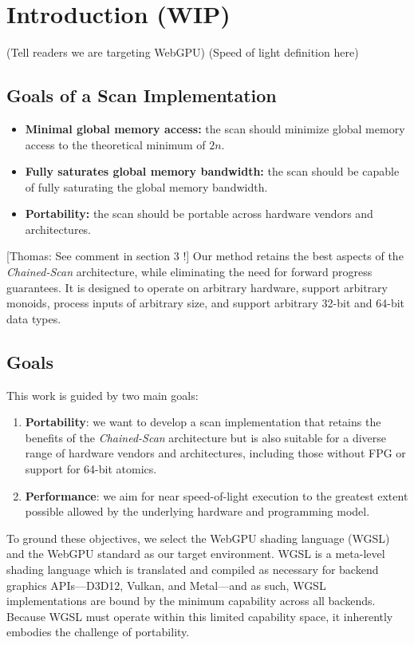 \documentclass[sigconf]{acmart}
\newcommand{\thomas}[1]{{\footnotesize\color{orange}[Thomas: #1]}}
\begin{document}
\section{Introduction (WIP)}
(Tell readers we are targeting WebGPU)
(Speed of light definition here)
\subsection{Goals of a Scan Implementation}
\begin{itemize}
  \item \textbf{Minimal global memory access:} the scan should minimize global memory access to the theoretical minimum of $2n$.
  \item \textbf{Fully saturates global memory bandwidth:} the scan should be capable of fully saturating the global memory bandwidth.
  \item \textbf{Portability:} the scan should be portable across hardware vendors and architectures.
\end{itemize}
\thomas{See comment in section 3 !}
Our method retains the best aspects of the \emph{Chained-Scan} architecture, while eliminating the need for forward progress guarantees. It is designed to operate on arbitrary hardware, support arbitrary monoids, process inputs of arbitrary size, and support arbitrary 32-bit and 64-bit data types.
\subsection{Goals}
This work is guided by two main goals:
\begin{enumerate}
  \item \textbf{Portability}: we want to develop a scan implementation that retains the benefits of the \emph{Chained-Scan} architecture but is also suitable for a diverse range of hardware vendors and architectures, including those without FPG or support for 64-bit atomics.
  \item \textbf{Performance}: we aim for near speed-of-light execution to the greatest extent possible allowed by the underlying hardware and programming model.
\end{enumerate}

\noindent
To ground these objectives, we select the WebGPU shading language (WGSL) and the WebGPU standard as our target environment. WGSL is a meta-level shading language which is translated and compiled as necessary for backend graphics APIs---D3D12, Vulkan, and Metal---and as such, WGSL implementations are bound by the minimum capability across all backends. Because WGSL must operate within this limited capability space, it inherently embodies the challenge of portability.
\end{document}
